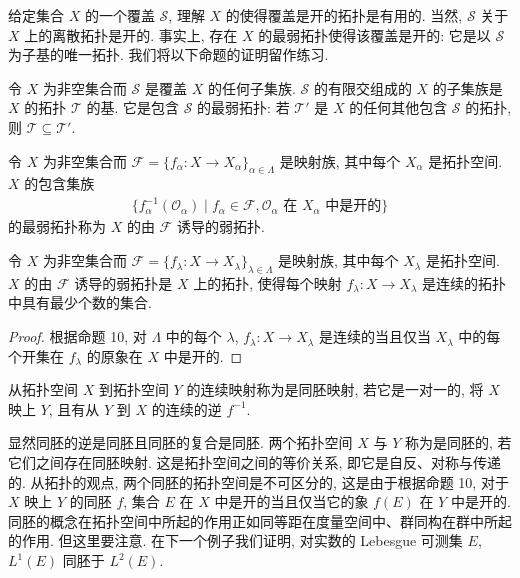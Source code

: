 \documentclass[../../main.tex]{subfiles}
\begin{document}
给定集合 $X$ 的一个覆盖 $\mathcal{S}$, 理解 $X$ 的使得覆盖是开的拓扑是有用的. 当然, $\mathcal{S}$ 关于 $X$ 上的离散拓扑是开的. 事实上, 存在 $X$ 的最弱拓扑使得该覆盖是开的: 它是以 $\mathcal{S}$ 为子基的唯一拓扑. 我们将以下命题的证明留作练习.

\begin{proposition}\label{proposition:ch11-弱拓扑基}
令 $X$ 为非空集合而 $\mathcal{S}$ 是覆盖 $X$ 的任何子集族. $\mathcal{S}$ 的有限交组成的 $X$ 的子集族是 $X$ 的拓扑 $\mathcal{T}$ 的基. 它是包含 $\mathcal{S}$ 的最弱拓扑: 若 $\mathcal{T}'$ 是 $X$ 的任何其他包含 $\mathcal{S}$ 的拓扑, 则 $\mathcal{T}\subseteq\mathcal{T}'$.
\end{proposition}

\begin{definition}[由映射族诱导的弱拓扑]\label{definition:ch11-弱拓扑}
令 $X$ 为非空集合而 $\mathcal{F}=\{f_{\alpha}:X\to X_{\alpha}\}_{\alpha\in\Lambda}$ 是映射族, 其中每个 $X_{\alpha}$ 是拓扑空间. $X$ 的包含集族
\begin{align*}
\{f_{\alpha}^{-1}(\mathcal{O}_{\alpha})\mid f_{\alpha}\in\mathcal{F},\mathcal{O}_{\alpha}\text{ 在 }X_{\alpha}\text{ 中是开的}\}
\end{align*}
的最弱拓扑称为 $X$ 的由 $\mathcal{F}$ 诱导的弱拓扑.
\end{definition}

\begin{proposition}\label{proposition:ch11-弱拓扑最少}
令 $X$ 为非空集合而 $\mathcal{F}=\{f_{\lambda}:X\to X_{\lambda}\}_{\lambda\in\Lambda}$ 是映射族, 其中每个 $X_{\lambda}$ 是拓扑空间. $X$ 的由 $\mathcal{F}$ 诱导的弱拓扑是 $X$ 上的拓扑, 使得每个映射 $f_{\lambda}:X\to X_{\lambda}$ 是连续的拓扑中具有最少个数的集合.
\end{proposition}

\begin{proof}
根据命题 10, 对 $\Lambda$ 中的每个 $\lambda$, $f_{\lambda}:X\to X_{\lambda}$ 是连续的当且仅当 $X_{\lambda}$ 中的每个开集在 $f_{\lambda}$ 的原象在 $X$ 中是开的.
\end{proof}

\begin{definition}[同胚]\label{definition:ch11-同胚}
从拓扑空间 $X$ 到拓扑空间 $Y$ 的连续映射称为是同胚映射, 若它是一对一的, 将 $X$ 映上 $Y$, 且有从 $Y$ 到 $X$ 的连续的逆 $f^{-1}$.
\end{definition}

显然同胚的逆是同胚且同胚的复合是同胚. 两个拓扑空间 $X$ 与 $Y$ 称为是同胚的, 若它们之间存在同胚映射. 这是拓扑空间之间的等价关系, 即它是自反、对称与传递的. 从拓扑的观点, 两个同胚的拓扑空间是不可区分的, 这是由于根据命题 10, 对于 $X$ 映上 $Y$ 的同胚 $f$, 集合 $E$ 在 $X$ 中是开的当且仅当它的象 $f(E)$ 在 $Y$ 中是开的. 同胚的概念在拓扑空间中所起的作用正如同等距在度量空间中、群同构在群中所起的作用. 但这里要注意. 在下一个例子我们证明, 对实数的 Lebesgue 可测集 $E$, $L^{1}(E)$ 同胚于 $L^{2}(E)$.
\end{document}
